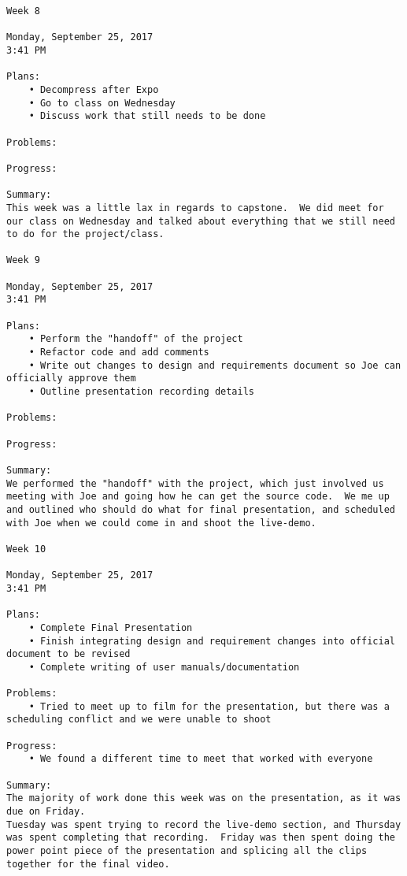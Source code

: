 \begin{lstlisting}
Week 8

Monday, September 25, 2017
3:41 PM

Plans:
	• Decompress after Expo
	• Go to class on Wednesday 
	• Discuss work that still needs to be done

Problems:

Progress:

Summary:
This week was a little lax in regards to capstone.  We did meet for our class on Wednesday and talked about everything that we still need to do for the project/class.

Week 9

Monday, September 25, 2017
3:41 PM

Plans:
	• Perform the "handoff" of the project
	• Refactor code and add comments
	• Write out changes to design and requirements document so Joe can officially approve them
	• Outline presentation recording details

Problems:

Progress:

Summary:
We performed the "handoff" with the project, which just involved us meeting with Joe and going how he can get the source code.  We me up and outlined who should do what for final presentation, and scheduled with Joe when we could come in and shoot the live-demo.

Week 10

Monday, September 25, 2017
3:41 PM

Plans:
	• Complete Final Presentation
	• Finish integrating design and requirement changes into official document to be revised
	• Complete writing of user manuals/documentation

Problems:
	• Tried to meet up to film for the presentation, but there was a scheduling conflict and we were unable to shoot

Progress:
	• We found a different time to meet that worked with everyone

Summary:
The majority of work done this week was on the presentation, as it was due on Friday.
Tuesday was spent trying to record the live-demo section, and Thursday was spent completing that recording.  Friday was then spent doing the power point piece of the presentation and splicing all the clips together for the final video.

\end{lstlisting}